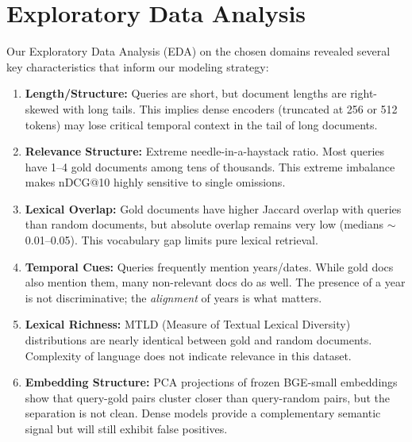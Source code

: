 \section{Exploratory Data Analysis}
\label{sec:eda}

Our Exploratory Data Analysis (EDA) on the chosen domains revealed several key characteristics that inform our modeling strategy:

\begin{enumerate}
    \item \textbf{Length/Structure:} Queries are short, but document lengths are right-skewed with long tails. This implies dense encoders (truncated at 256 or 512 tokens) may lose critical temporal context in the tail of long documents.
    \item \textbf{Relevance Structure:} Extreme needle-in-a-haystack ratio. Most queries have 1–4 gold documents among tens of thousands. This extreme imbalance makes nDCG@10 highly sensitive to single omissions.
    \item \textbf{Lexical Overlap:} Gold documents have higher Jaccard overlap with queries than random documents, but absolute overlap remains very low (medians $\sim$0.01–0.05). This vocabulary gap limits pure lexical retrieval.
    \item \textbf{Temporal Cues:} Queries frequently mention years/dates. While gold docs also mention them, many non-relevant docs do as well. The presence of a year is not discriminative; the \textit{alignment} of years is what matters.
    \item \textbf{Lexical Richness:} MTLD (Measure of Textual Lexical Diversity) distributions are nearly identical between gold and random documents. Complexity of language does not indicate relevance in this dataset.
    \item \textbf{Embedding Structure:} PCA projections of frozen BGE-small embeddings show that query-gold pairs cluster closer than query-random pairs, but the separation is not clean. Dense models provide a complementary semantic signal but will still exhibit false positives.
\end{enumerate}
